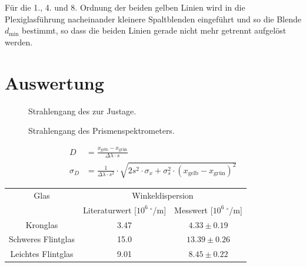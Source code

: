 \documentclass[12pt,a4paper,titlepage,headinclude,bibtotoc]{scrartcl}
\begin{document}
Für die 1., 4. und 8. Ordnung der beiden gelben Linien wird in die Plexiglasführung nacheinander kleinere Spaltblenden eingeführt und so die Blende $d_\text{min}$ bestimmt, so dass die beiden Linien gerade nicht mehr getrennt aufgelöst werden.

\section{Auswertung}
\label{sec:auswertung}
\begin{figure}[!htb]
	\def\svgwidth{0.8\linewidth}	
	
	\caption{Strahlengang des zur Justage.}
\end{figure}


\begin{figure}[!htb]
	\def\svgwidth{0.8\linewidth}
	
	\caption{Strahlengang des Prismenspektrometers.}
\end{figure}

\begin{align}
	D&=\frac{x_\text{gelb} - x_\text{grün}}{\Delta\lambda \cdot s}\\
\sigma_{D}&=\frac{1}{\Delta\lambda \cdot s^{2}} \cdot \sqrt{2s^{2} \cdot \sigma_{x} + \sigma_{s}^{2} \cdot \left(x_\text{gelb} - x_\text{grün}\right)^{2}}
\end{align}


\begin{table}[!htb]
	\centering
	\begin{tabular}{|c||c|c|}
		\hline
		Glas & \multicolumn{2}{c|}{Winkeldispersion}\\		
		 & Literaturwert [$10^6~^\circ$/m] & Messwert [$10^6~^\circ$/m]\\
		\hline
		\hline
		Kronglas& 3.47 & $4.33 \pm 0.19$ \\
		Schweres Flintglas & 15.0 & $13.39 \pm 0.26$ \\
		Leichtes Flintglas & 9.01 & $8.45 \pm 0.22$ \\
		\hline
	\end{tabular}
	\label{tab:Dispersion}
\end{table}
\end{document}
